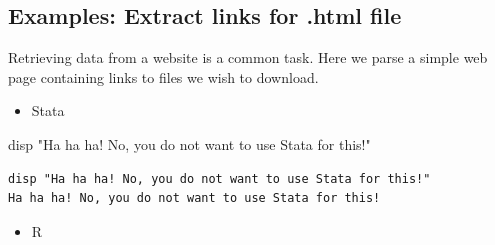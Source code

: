 \documentclass[]{book}
\newenvironment{Shaded}{\begin{snugshade}}{\end{snugshade}}
\newcommand{\CharTok}[1]{\textcolor[rgb]{0.31,0.60,0.02}{#1}}
\newcommand{\DataTypeTok}[1]{\textcolor[rgb]{0.13,0.29,0.53}{#1}}
\newcommand{\KeywordTok}[1]{\textcolor[rgb]{0.13,0.29,0.53}{\textbf{#1}}}
\newcommand{\NormalTok}[1]{#1}
\newcommand{\OtherTok}[1]{\textcolor[rgb]{0.56,0.35,0.01}{#1}}
\newcommand{\StringTok}[1]{\textcolor[rgb]{0.31,0.60,0.02}{#1}}
\providecommand{\tightlist}{%
  \setlength{\itemsep}{0pt}\setlength{\parskip}{0pt}}
\begin{document}
\hypertarget{examples-extract-links-for-.html-file}{%
\subsection{Examples: Extract links for .html file}\label{examples-extract-links-for-.html-file}}

Retrieving data from a website is a common task. Here we parse a simple web page containing links to files we wish to download.

\begin{itemize}
\tightlist
\item
  Stata
\end{itemize}

\begin{Shaded}
\begin{Highlighting}[]
\NormalTok{disp }\StringTok{"Ha ha ha! No, you do not want to use Stata for this!"}
\end{Highlighting}
\end{Shaded}

\begin{verbatim}
disp "Ha ha ha! No, you do not want to use Stata for this!"
Ha ha ha! No, you do not want to use Stata for this!
\end{verbatim}

\begin{itemize}
\tightlist
\item
  R
\end{itemize}

\begin{Shaded}
\end{Shaded}
\end{document}

